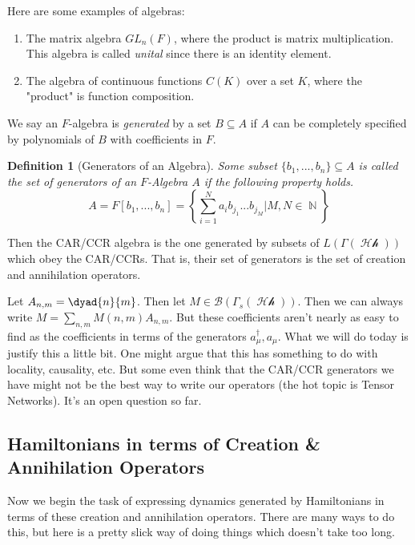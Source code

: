 \documentclass{article}
\DeclareMathOperator{\Hh}{\mathcal{Hh}}
\DeclareMathOperator{\NN}{\mathbb{N}}
\newtheorem{defn}{Definition}
\begin{document}
Here are some examples of algebras:
\begin{enumerate}
\item The matrix algebra $GL_n(F)$, where the product is matrix multiplication. This algebra is called \textit{unital} since there is an identity element.
\item The algebra of continuous functions $C(K)$ over a set $K$, where the "product" is function composition.
\end{enumerate}

We say an $F$-algebra is \textit{generated} by a set $B \subseteq A$ if $A$ can be completely specified by polynomials of $B$ with coefficients in $F$.

\begin{defn}[Generators of an Algebra] Some subset $\{b_1,...,b_n\}\subseteq A$ is called the set of generators of an $F$-Algebra $A$ if the following property holds.
\begin{equation}
A = F[b_1,...,b_n] = \left\{\sum_{i=1}^N a_i b_{j_1}...b_{j_M} | M, N \in \NN\right\}
\end{equation}
\end{defn}

Then the CAR/CCR algebra is the one generated by subsets of $L(\Gamma(\Hh))$ which obey the CAR/CCRs. That is, their set of generators is the set of creation and annihilation operators.

Let $A_{n,m} = \dyad{n}{m}$. Then let $M \in \mathcal{B}(\Gamma_s(\Hh))$. Then we can always write $M = \sum_{n,m} M(n,m) A_{n,m}$. But these coefficients aren't nearly as easy to find as the coefficients in terms of the generators $a_\mu^\dagger, a_\mu$. What we will do today is justify this a little bit. One might argue that this has something to do with locality, causality, etc. But some even think that the CAR/CCR generators we have might not be the best way to write our operators (the hot topic is Tensor Networks). It's an open question so far.

\subsection{Hamiltonians in terms of Creation \& Annihilation Operators}
Now we begin the task of expressing dynamics generated by Hamiltonians in terms of these creation and annihilation operators. There are many ways to do this, but here is a pretty slick way of doing things which doesn't take too long.
\end{document}
